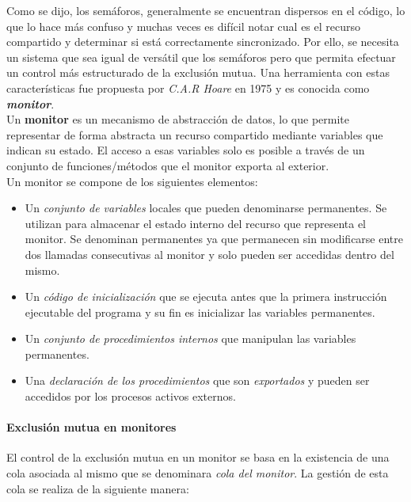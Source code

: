Como se dijo, los semáforos, generalmente se encuentran dispersos en el código, lo que lo hace más confuso y muchas veces es difícil notar cual es el recurso compartido y determinar si está correctamente sincronizado. Por ello, se necesita un sistema que sea igual de versátil que los semáforos pero que permita efectuar un control más estructurado de la exclusión mutua. Una herramienta con estas características fue propuesta por \textit{C.A.R Hoare} en 1975 y es conocida como \textbf{\textit{monitor}}.\\
Un \textbf{monitor} es un mecanismo de abstracción de datos, lo que permite representar de forma abstracta un recurso compartido mediante variables que indican su estado. El acceso a esas variables solo es posible a través de un conjunto de funciones/métodos que el monitor exporta al exterior.\\

Un monitor se compone de los siguientes elementos:
\begin{itemize}
    \item Un \textit{conjunto de variables} locales que pueden denominarse permanentes. Se utilizan para almacenar el estado interno del recurso que representa el monitor. Se denominan permanentes ya que permanecen sin modificarse entre dos llamadas consecutivas al monitor y solo pueden ser accedidas dentro del mismo.
    
    \item Un \textit{código de inicialización} que se ejecuta antes que la primera instrucción ejecutable del programa y su fin es inicializar las variables permanentes. 

    \item Un \textit{conjunto de procedimientos internos} que manipulan las variables permanentes.
    
    \item Una \textit{declaración de los procedimientos} que son \textit{exportados} y pueden ser accedidos por los procesos activos externos.
\end{itemize}

\paragraph{Exclusión mutua en monitores}
\hfill
\par El control de la exclusión mutua en un monitor se basa en la existencia de una cola asociada al mismo que se denominara \textit{cola del monitor}. La gestión de esta cola se realiza de la siguiente manera:

